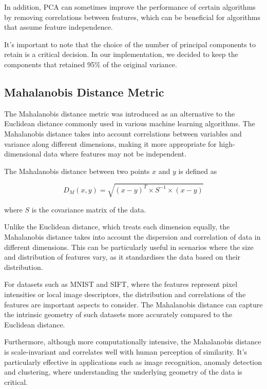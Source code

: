 \documentclass[sigconf, nonacm]{acmart}
\begin{document}
In addition, PCA can sometimes improve the performance of certain algorithms by removing correlations between features, which can be beneficial for algorithms that assume feature independence.

It's important to note that the choice of the number of principal components to retain is a critical decision. In our implementation, we decided to keep the components that retained 95\% of the original variance.

\subsection{Mahalanobis Distance Metric}
The Mahalanobis distance metric was introduced as an alternative to the Euclidean distance commonly used in various machine learning algorithms. The Mahalanobis distance takes into account correlations between variables and variance along different dimensions, making it more appropriate for high-dimensional data where features may not be independent.

The Mahalanobis distance between two points $x$ and $y$ is defined as

\begin{equation}
D_M(x, y) = \sqrt{(x-y)^T \times S^{-1} \times (x-y)}
\end{equation}

where $S$ is the covariance matrix of the data.

Unlike the Euclidean distance, which treats each dimension equally, the Mahalanobis distance takes into account the dispersion and correlation of data in different dimensions. This can be particularly useful in scenarios where the size and distribution of features vary, as it standardises the data based on their distribution.

For datasets such as MNIST and SIFT, where the features represent pixel intensities or local image descriptors, the distribution and correlations of the features are important aspects to consider. The Mahalanobis distance can capture the intrinsic geometry of such datasets more accurately compared to the Euclidean distance.

Furthermore, although more computationally intensive, the Mahalanobis distance is scale-invariant and correlates well with human perception of similarity. It's particularly effective in applications such as image recognition, anomaly detection and clustering, where understanding the underlying geometry of the data is critical.
\end{document}
